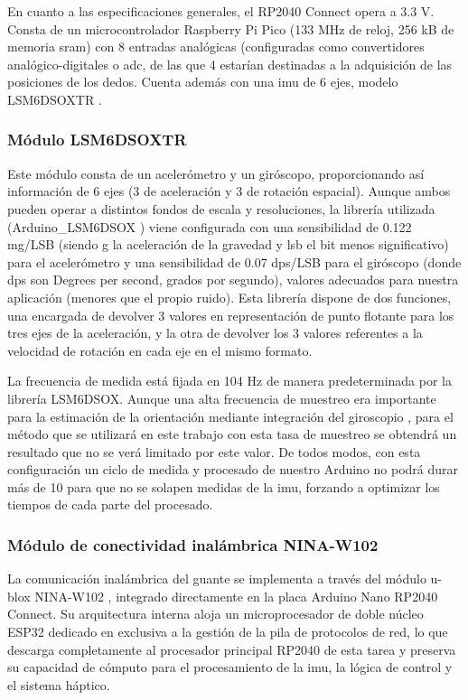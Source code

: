 \documentclass[12pt]{article}
\begin{document}
En cuanto a las especificaciones generales, el RP2040 Connect opera a 3.3 V. Consta de un microcontrolador Raspberry Pi Pico (133 MHz de reloj, 256 kB de memoria \gls{sram}) con 8 entradas analógicas (configuradas como convertidores analógico-digitales o  \gls{adc}, de las que 4 estarían destinadas a la adquisición de las posiciones de los dedos. Cuenta además con una \gls{imu} de 6 ejes, modelo LSM6DSOXTR \cite{LSM6DSOX}.
\

\subsubsection{Módulo LSM6DSOXTR}

Este módulo \cite{LSM6DSOX} consta de un acelerómetro y un giróscopo, proporcionando así información de 6 ejes (3 de aceleración y 3 de rotación espacial). Aunque ambos pueden operar a distintos fondos de escala y resoluciones, la librería utilizada (Arduino\_LSM6DSOX \cite{LibreriaLSM6DSOX}) viene configurada con una sensibilidad de 0.122 mg/LSB (siendo g la aceleración de la gravedad y \gls{lsb} el bit menos significativo) para el acelerómetro y una sensibilidad de 0.07 dps/LSB para el giróscopo (donde dps son Degrees per second, grados por segundo), valores adecuados para nuestra aplicación
(menores que el propio ruido). Esta librería dispone de dos funciones, una encargada de devolver 3 valores en representación de punto flotante para los tres ejes de la aceleración, y la otra de devolver los 3 valores referentes a la velocidad de rotación en cada eje en el mismo formato.

La frecuencia de medida está fijada en 104 Hz de manera predeterminada por la librería LSM6DSOX. Aunque una alta frecuencia de muestreo era importante para la estimación de la orientación mediante integración del giroscopio \cite{TFG}, para el método que se utilizará en este trabajo con esta tasa de muestreo se obtendrá un resultado que no se verá limitado por este valor. De todos modos, con esta configuración un ciclo de medida y procesado de nuestro Arduino no podrá durar más de 10  para que no se solapen medidas de la \gls{imu}, forzando a optimizar los tiempos de cada parte del procesado.

\subsubsection{Módulo de conectividad inalámbrica NINA-W102}

La comunicación inalámbrica del guante se implementa a través del módulo u-blox NINA-W102 \cite{NINA-W102}, integrado directamente en la placa Arduino Nano RP2040 Connect. Su arquitectura interna aloja un microprocesador de doble núcleo ESP32 dedicado en exclusiva a la gestión de la pila de protocolos de red, lo que descarga completamente al procesador principal RP2040 de esta tarea y preserva su capacidad de cómputo para el procesamiento de la \gls{imu}, la lógica de control y el sistema háptico.
\end{document}
